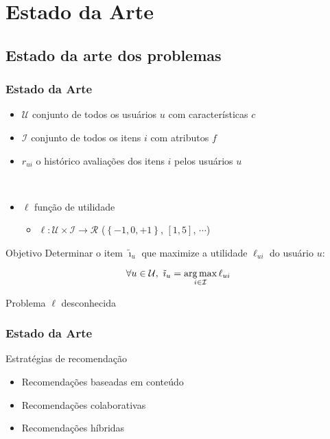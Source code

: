 \section[Estado da Arte]{Estado da Arte}
\subsection{Estado da arte dos problemas} %
\label{sub:estado_da_arte_dos_problemas}
\begin{frame}
\frametitle{Estado da Arte}
\begin{itemize}
	\item $\mathcal{U}$ conjunto de todos os usuários $u$ com características $c$
	\item $\mathcal{I}$ conjunto de todos os itens $i$ com atributos $f$
	\item $r_{ui}$ o histórico avaliações dos itens $i$ pelos usuários $u$\par{~}
	\item $\ell$ função de utilidade 
	\begin{itemize}
		\item $\ell: \mathcal{U} \times \mathcal{I} \rightarrow \mathcal{R}$ ($\left\{-1, 0, +1\right\}$,  $[1, 5]$, $\cdots$)
	\end{itemize}
\end{itemize}


\begin{block}{Objetivo}
Determinar o item $\tilde{\imath}_u$ que maximize a utilidade $\ell_{ui}$ do usuário $u$:


\begin{equation} 
\label{eq:utilidade}
\forall u \in \mathcal{U}, ~ \tilde{\imath}_u = \operatorname*{arg\,max}_{i \in \mathcal{I}}{\ell_{ui}}
\end{equation}
\end{block}

\begin{alertblock}{Problema}
$\ell$ desconhecida
\end{alertblock}
\end{frame}




\begin{frame}
\frametitle{Estado da Arte}
\begin{block}{Estratégias de recomendação}
\begin{itemize}
	\item Recomendações baseadas em conteúdo
	\item Recomendações colaborativas
	\item Recomendações híbridas
\end{itemize}
\end{block}

\end{frame}



